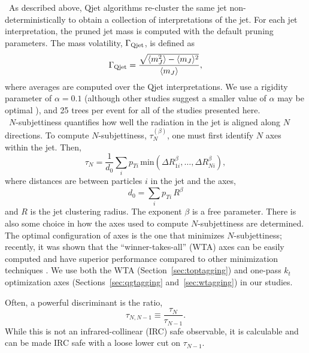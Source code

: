 ~As described above, Qjet algorithms re-cluster the same jet non-deterministically to obtain a collection of interpretations of the jet. For each jet interpretation, the pruned jet mass is computed with the default pruning parameters. The mass volatility, $\Gamma_{\rm Qjet}$, is defined as \cite{Ellis:2012sn}
%
\begin{equation}
\Gamma_{\rm Qjet} = \frac{\sqrt{\langle m_J^2 \rangle-\langle m_J\rangle^2}}{\langle m_J\rangle},
\end{equation}
%
where averages are computed over the Qjet interpretations. We use a rigidity parameter of $\alpha=0.1$ (although other studies suggest a smaller value of $\alpha$ may be optimal \cite{Ellis:2012sn,Ellis:2014eya}), and 25 trees per event for all of the studies presented here.\\

~$N$-subjettiness \cite{Thaler:2010tr} quantifies how well the radiation in the jet is aligned along $N$ directions. To compute $N$-subjettiness, $\tau_N^{(\beta)}$, one must first identify $N$ axes within the jet. Then,
%
\begin{equation}
\tau_N = \frac{1}{d_0} \sum_i p_{Ti} \,\mathrm{min}\left( \Delta R_{1i}^\beta,\ldots,\Delta R_{Ni}^\beta\right),
\end{equation}
%
where distances are between particles $i$ in the jet and the axes,
%
\begin{equation}
d_0 = \sum_i p_{Ti}\,R^\beta
\end{equation}
%
and $R$ is the jet clustering radius. The exponent $\beta$ is a free parameter. There is also some choice in how the axes used to compute $N$-subjettiness are determined. The optimal configuration of axes is the one that minimizes
$N$-subjettiness; recently, it was shown that the ``winner-takes-all'' (WTA) axes can be easily computed and have superior performance compared to other minimization techniques \cite{Larkoski:2014uqa}. We use both the WTA (Section~\ref{sec:toptagging}) and one-pass $k_t$ optimization axes (Sections~\ref{sec:qgtagging} and~\ref{sec:wtagging}) in our studies.

Often, a  powerful discriminant is  the ratio,
%
\begin{equation}
\tau_{N,N-1} \equiv \frac{\tau_N}{\tau_{N-1}}.
\end{equation}
%
While this is not an infrared-collinear (IRC) safe observable, it is calculable \cite{Larkoski:2013paa} and can be made IRC safe with a loose lower cut on $\tau_{N-1}$.\\


